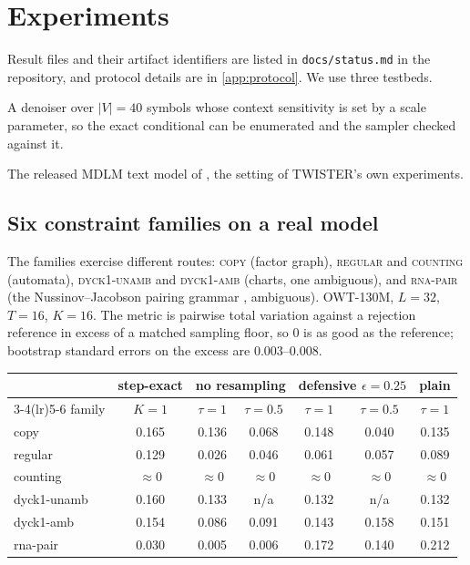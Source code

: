 \documentclass[11pt]{article}
\theoremstyle{definition}
\begin{document}
\section{Experiments}\label{sec:experiments}
Result files and their artifact identifiers are listed in \texttt{docs/status.md} in the repository, and protocol
details are in \cref{app:protocol}. We use three testbeds.

\begin{description}[leftmargin=1.6em,itemsep=2pt]
\item[Synthetic.] A denoiser over $|V|=40$ symbols whose context sensitivity is set by a scale parameter, so the
  exact conditional can be enumerated and the sampler checked against it.
\item[OWT-130M.] The released MDLM text model of \cite{sahoo2024}, the setting of TWISTER's own experiments.
\end{description}

\subsection{Six constraint families on a real model}\label{sec:expe1}
The families exercise different routes: \textsc{copy} (factor graph), \textsc{regular} and
\textsc{counting} (automata), \textsc{dyck1-unamb} and \textsc{dyck1-amb} (charts, one ambiguous), and
\textsc{rna-pair} (the Nussinov--Jacobson pairing grammar \cite{nussinov1980}, ambiguous). OWT-130M, $L=32$,
$T=16$, $K=16$. The metric is pairwise total variation against a rejection reference in excess of a matched
sampling floor, so 0 is as good as the reference; bootstrap standard errors on the excess are $0.003$--$0.008$.

\begin{center}\small
\begin{tabular}{lcccccc}
\toprule
 & step-exact & \multicolumn{2}{c}{no resampling} & \multicolumn{2}{c}{defensive $\epsilon=0.25$} & plain \\
\cmidrule(lr){3-4}\cmidrule(lr){5-6}
family & $K=1$ & $\tau=1$ & $\tau=0.5$ & $\tau=1$ & $\tau=0.5$ & $\tau=1$ \\
\midrule
copy          & 0.165 & 0.136 & 0.068 & 0.148 & 0.040 & 0.135\\
regular       & 0.129 & 0.026 & 0.046 & 0.061 & 0.057 & 0.089\\
counting      & $\approx0$ & $\approx0$ & $\approx0$ & $\approx0$ & $\approx0$ & $\approx0$\\
dyck1-unamb   & 0.160 & 0.133 & n/a   & 0.132 & n/a   & 0.132\\
dyck1-amb     & 0.154 & 0.086 & 0.091 & 0.143 & 0.158 & 0.151\\
rna-pair      & 0.030 & 0.005 & 0.006 & 0.172 & 0.140 & 0.212\\
\bottomrule
\end{tabular}
\end{center}
\end{document}
